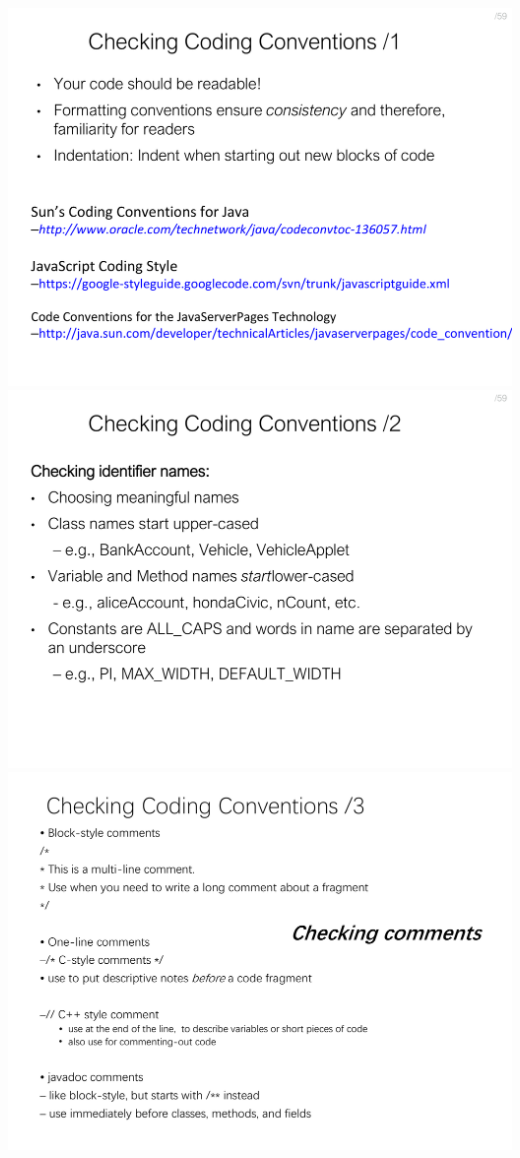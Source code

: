 \documentclass[a4paper]{article}
\begin{document}
\begin{multicols}{3}
        \includegraphics[width=\linewidth]{419.pdf}\\
        \includegraphics[width=\linewidth]{420.pdf}\\
        \includegraphics[width=\linewidth]{421.pdf}\\

\end{multicols}
\end{document}
